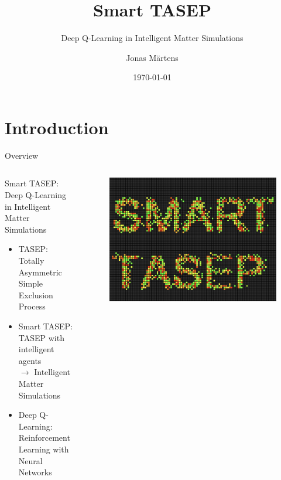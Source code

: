 \documentclass[10pt,xcolor=table, aspectratio=1610]{beamer}
\title{Smart TASEP}
\subtitle{Deep Q-Learning in Intelligent Matter Simulations}
\date{\today}
\author{Jonas Märtens}
\institute{LMU Munich}
\begin{document}
\maketitle

\section{Introduction}
\begin{frame}{Overview}
    \begin{columns}
      \begin{block}{Smart TASEP: Deep Q-Learning in Intelligent Matter Simulations}
      \begin{itemize}
        \item TASEP: Totally Asymmetric Simple Exclusion Process
        \item Smart TASEP: TASEP with intelligent agents \\
              $\rightarrow$ Intelligent Matter Simulations
        \item Deep Q-Learning: Reinforcement Learning with Neural Networks
      \end{itemize}
      \end{block}
      \begin{figure}
        \includegraphics[width=\textwidth]{img/smarttasep.png}
      \end{figure}
    \end{columns}
\end{frame}
\end{document}
